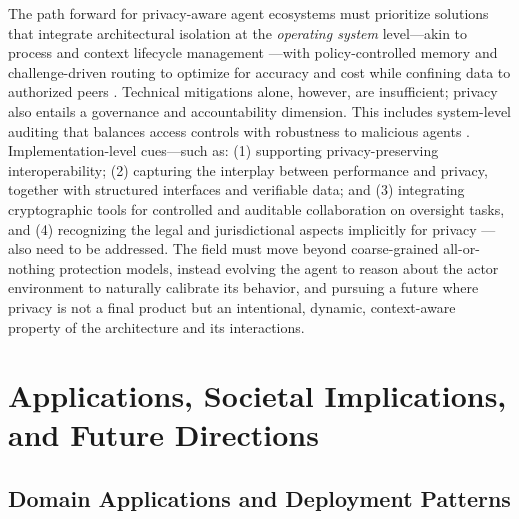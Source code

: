 \documentclass[11pt,a4paper]{article}
\begin{document}
The path forward for privacy-aware agent ecosystems must prioritize solutions that integrate architectural isolation at the \emph{operating system} level---akin to process and context lifecycle management \cite{arxiv:2603.13110v1,arxiv:2504.00587v2}---with policy-controlled memory \cite{arxiv:2505.18279v1} and challenge-driven routing to optimize for accuracy and cost while confining data to authorized peers \cite{arxiv:2502.11133v1,arxiv:2503.07675v2}. Technical mitigations alone, however, are insufficient; privacy also entails a governance and accountability dimension. This includes system-level auditing that balances access controls with robustness to malicious agents \cite{arxiv:2601.00481v1}. Implementation-level cues---such as: (1) supporting privacy-preserving interoperability; (2) capturing the interplay between performance and privacy, together with structured interfaces and verifiable data; and (3) integrating cryptographic tools for controlled and auditable collaboration on oversight tasks, and (4) recognizing the legal and jurisdictional aspects implicitly for privacy \cite{arxiv:2411.14033v2}---also need to be addressed. The field must move beyond coarse-grained all-or-nothing protection models, instead evolving the agent to reason about the actor environment to naturally calibrate its behavior, and pursuing a future where privacy is not a final product but an intentional, dynamic, context-aware property of the architecture and its interactions.


\section{Applications, Societal Implications, and Future Directions}



\subsection{Domain Applications and Deployment Patterns}
\end{document}
